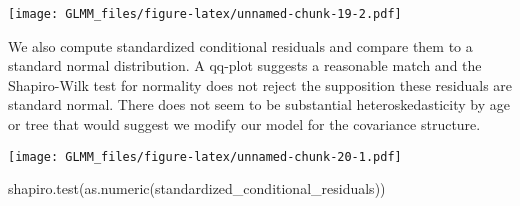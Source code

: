 \documentclass[
]{book}
\newenvironment{Shaded}{\begin{snugshade}}{\end{snugshade}}
\newcommand{\AttributeTok}[1]{\textcolor[rgb]{0.77,0.63,0.00}{#1}}
\newcommand{\DecValTok}[1]{\textcolor[rgb]{0.00,0.00,0.81}{#1}}
\newcommand{\FunctionTok}[1]{\textcolor[rgb]{0.00,0.00,0.00}{#1}}
\newcommand{\NormalTok}[1]{#1}
\newcommand{\OtherTok}[1]{\textcolor[rgb]{0.56,0.35,0.01}{#1}}
\newcommand{\SpecialCharTok}[1]{\textcolor[rgb]{0.00,0.00,0.00}{#1}}
\begin{document}
\texttt{[image: GLMM\_files/figure-latex/unnamed-chunk-19-2.pdf]}

We also compute standardized conditional residuals and compare them to a standard normal distribution. A qq-plot suggests a reasonable match and the Shapiro-Wilk test for normality does not reject the supposition these residuals are standard normal. There does not seem to be substantial heteroskedasticity by age or tree that would suggest we modify our model for the covariance structure.

\begin{Shaded}
\end{Shaded}

\texttt{[image: GLMM\_files/figure-latex/unnamed-chunk-20-1.pdf]}

\begin{Shaded}
\begin{Highlighting}[]
\FunctionTok{shapiro.test}\NormalTok{(}\FunctionTok{as.numeric}\NormalTok{(standardized\_conditional\_residuals))}
\end{Highlighting}
\end{Shaded}
\end{document}
